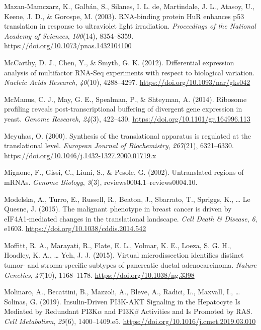 \documentclass[12pt,openany]{book}
\begin{document}
\hypertarget{ref-Mazan-Mamczarz2003}{}
Mazan-Mamczarz, K., Galbán, S., Silanes, I. L. de, Martindale, J. L.,
Atasoy, U., Keene, J. D., \& Gorospe, M. (2003). RNA-binding protein HuR
enhances p53 translation in response to ultraviolet light irradiation.
\emph{Proceedings of the National Academy of Sciences}, \emph{100}(14),
8354--8359. \url{https://doi.org/10.1073/pnas.1432104100}

\hypertarget{ref-McCarthy2012}{}
McCarthy, D. J., Chen, Y., \& Smyth, G. K. (2012). Differential
expression analysis of multifactor RNA-Seq experiments with respect to
biological variation. \emph{Nucleic Acids Research}, \emph{40}(10),
4288--4297. \url{https://doi.org/10.1093/nar/gks042}

\hypertarget{ref-McManus2014}{}
McManus, C. J., May, G. E., Spealman, P., \& Shteyman, A. (2014).
Ribosome profiling reveals post-transcriptional buffering of divergent
gene expression in yeast. \emph{Genome Research}, \emph{24}(3),
422--430. \url{https://doi.org/10.1101/gr.164996.113}

\hypertarget{ref-Meyuhas2000}{}
Meyuhas, O. (2000). Synthesis of the translational apparatus is
regulated at the translational level. \emph{European Journal of
Biochemistry}, \emph{267}(21), 6321--6330.
\url{https://doi.org/10.1046/j.1432-1327.2000.01719.x}

\hypertarget{ref-Mignone2002}{}
Mignone, F., Gissi, C., Liuni, S., \& Pesole, G. (2002). Untranslated
regions of mRNAs. \emph{Genome Biology}, \emph{3}(3),
reviews0004.1--reviews0004.10.

\hypertarget{ref-Modelska2015}{}
Modelska, A., Turro, E., Russell, R., Beaton, J., Sbarrato, T., Spriggs,
K., \ldots{} Le Quesne, J. (2015). The malignant phenotype in breast
cancer is driven by eIF4A1-mediated changes in the translational
landscape. \emph{Cell Death \& Disease}, \emph{6}, e1603.
\url{https://doi.org/10.1038/cddis.2014.542}

\hypertarget{ref-Moffitt2015}{}
Moffitt, R. A., Marayati, R., Flate, E. L., Volmar, K. E., Loeza, S. G.
H., Hoadley, K. A., \ldots{} Yeh, J. J. (2015). Virtual microdissection
identifies distinct tumor- and stroma-specific subtypes of pancreatic
ductal adenocarcinoma. \emph{Nature Genetics}, \emph{47}(10),
1168--1178. \url{https://doi.org/10.1038/ng.3398}

\hypertarget{ref-Molinaro2019}{}
Molinaro, A., Becattini, B., Mazzoli, A., Bleve, A., Radici, L.,
Maxvall, I., \ldots{} Solinas, G. (2019). Insulin-Driven PI3K-AKT
Signaling in the Hepatocyte Is Mediated by Redundant PI3K\(\alpha\) and
PI3K\(\beta\) Activities and Is Promoted by RAS. \emph{Cell Metabolism},
\emph{29}(6), 1400--1409.e5.
\url{https://doi.org/10.1016/j.cmet.2019.03.010}
\end{document}
